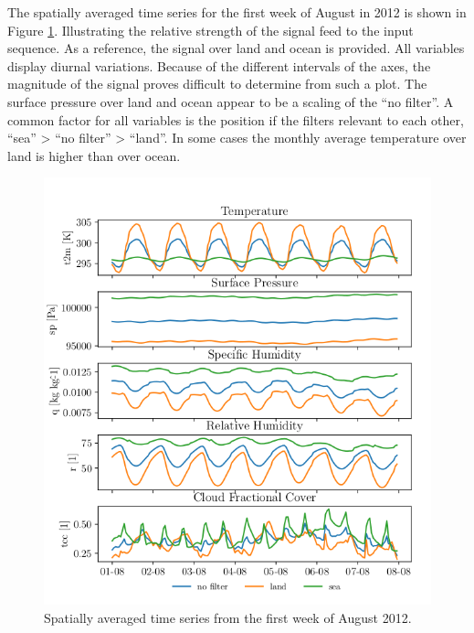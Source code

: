 The spatially averaged time series for the first week of August in 2012 is shown in Figure \ref{fig:first_week_august_2012}. Illustrating the relative strength of the signal feed to the input sequence. As a reference, the signal over land and ocean is provided. All variables display diurnal variations. Because of the different intervals of the axes, the magnitude of the signal proves difficult to determine from such a plot. The surface pressure over land and ocean appear to be a scaling of the ``no filter''. A common factor for all variables is the position if the filters relevant to each other, ``sea'' > ``no filter'' > ``land''. In some cases the monthly average temperature over land is higher than over ocean.
\begin{figure}[ht]
    \centering
    \includegraphics{python_figs/spatially_averaged_one_week_from_2012-08-01.png}
    \caption{Spatially averaged time series from the first week of August 2012.}
    \label{fig:first_week_august_2012}
\end{figure}


